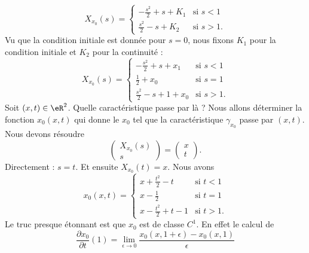 \begin{example}
\begin{equation}
        X_{x_0}(s)=\begin{cases}
            -\frac{ s^2 }{2}+s+K_1    &   \text{si } s<1\\
            \frac{ s^2 }{2}-s+K_2    &    \text{si } s>1.
        \end{cases}
    \end{equation}
    Vu que la condition initiale est donnée pour \( s=0\), nous fixons \( K_1\) pour la condition initiale et \( K_2\) pour la continuité :
    \begin{equation}
        X_{x_0}(s)=\begin{cases}
            -\frac{ s^2 }{2}+s+x_1   &   \text{si }  s<1\\
            \frac{ 1 }{2}+x_0    &    \text{si } s=1\\
            \frac{ s^2 }{2}-s+1+x_0    &    \text{si } s>1.
        \end{cases}
    \end{equation}
    Soit \( (x,t)\in \eR^2\). Quelle caractéristique passe par là ? Nous allons déterminer la fonction \( x_0(x,t)\) qui donne le \( x_0\) tel que la caractéristique \( \gamma_{x_0}\) passe par \( (x,t)\). Nous devons résoudre
    \begin{equation}
        \begin{pmatrix}
            X_{x_0}(s)    \\ 
            s    
        \end{pmatrix}=\begin{pmatrix}
            x    \\ 
            t    
        \end{pmatrix}.
    \end{equation}
    Directement : \( s=t\). Et ensuite \( X_{x_0}(t)=x\). Nous avons
    \begin{equation}
        x_0(x,t)=\begin{cases}
            x+\frac{ t^2 }{2}-t   &   \text{si } t<1\\
            x-\frac{ 1 }{2}    &    \text{si } t=1\\
            x-\frac{ t^2 }{2}+t-1    &    \text{si } t>1.
        \end{cases}
    \end{equation}
    Le truc presque étonnant est que \( x_0\) est de classe \( C^1\). En effet le calcul de
    \begin{equation}
        \frac{ \partial x_0 }{ \partial t }(1)=\lim_{\epsilon\to 0}\frac{ x_0(x,1+\epsilon)-x_0(x,1) }{ \epsilon }
    \end{equation}

\end{example}
